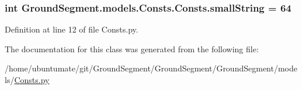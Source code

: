 \subsubsection[{small\+String}]{\setlength{\rightskip}{0pt plus 5cm}int Ground\+Segment.\+models.\+Consts.\+Consts.\+small\+String = 64\hspace{0.3cm}{\ttfamily [static]}}\label{class_ground_segment_1_1models_1_1_consts_1_1_consts_a3788d24e86a0ffb03efc2a6bb1f88643}


Definition at line 12 of file Consts.\+py.



The documentation for this class was generated from the following file\+:\begin{DoxyCompactItemize}
\item 
/home/ubuntumate/git/\+Ground\+Segment/\+Ground\+Segment/\+Ground\+Segment/models/\hyperlink{_consts_8py}{Consts.\+py}\end{DoxyCompactItemize}
